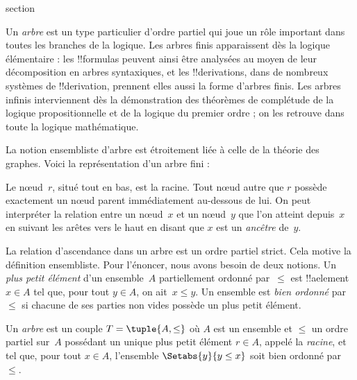 \documentclass[11pt,a4paper,openany]{memoir}
\begin{document}
\begingroup
\expandafter\def\csname ol@sectioncs\endcsname{section}
\def\olfilename{trees}



Un \emph{arbre} est un type particulier d’ordre partiel qui joue un rôle
important dans toutes les branches de la logique. Les arbres finis
apparaissent dès la logique élémentaire : les !!{formula}s peuvent ainsi
être analysées au moyen de leur décomposition en arbres syntaxiques,
et les !!{derivation}s, dans de nombreux systèmes de !!{derivation},
prennent elles aussi la forme d’arbres finis.
%
Les arbres infinis interviennent dès la démonstration des théorèmes
de complétude de la logique propositionnelle et de la logique du premier
ordre ; on les retrouve dans toute la logique mathématique.

La notion ensembliste d’arbre est étroitement liée à celle de la théorie
des graphes. Voici la représentation d’un arbre fini :

\begin{center}
\end{center}

Le nœud~$r$, situé tout en bas, est la racine. Tout nœud autre que $r$
possède exactement un nœud parent immédiatement au-dessous de lui.
On peut interpréter la relation entre un nœud~$x$ et un nœud~$y$ que
l’on atteint depuis~$x$ en suivant les arêtes vers le haut en disant
que $x$ est un \emph{ancêtre} de~$y$.

La relation d’ascendance dans un arbre est un ordre partiel strict.
Cela motive la définition ensembliste. Pour l’énoncer, nous avons besoin
de deux notions. Un \emph{plus petit élément} d’un ensemble~$A$
partiellement ordonné par~$\le$ est !!a{element} $x \in A$ tel que,
pour tout $y \in A$, on ait~$x \le y$. Un ensemble est \emph{bien ordonné}
par~$\le$ si chacune de ses parties non vides possède un plus petit élément.

\begin{defn}[Arbre]
Un \emph{arbre} est un couple $T = \tuple{A, \le}$ où $A$ est un ensemble
et $\le$ un ordre partiel sur~$A$ possédant un unique plus petit élément
$r \in A$, appelé la \emph{racine}, et tel que, pour tout $x \in A$,
l’ensemble $\Setabs{y}{y \le x}$ soit bien ordonné par~$\le$.
\end{defn}
\end{document}
